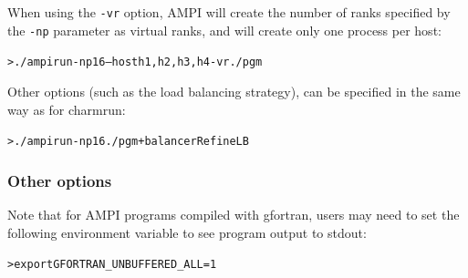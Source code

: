 \documentclass[10pt]{article}
\begin{document}
When using the \texttt{-vr} option, AMPI will create the number of ranks specified by the \texttt{-np} parameter as virtual ranks, and will create only one process per host:
\begin{alltt}
> ./ampirun -np 16 --host h1,h2,h3,h4 -vr ./pgm
\end{alltt}

Other options (such as the load balancing strategy), can be specified in the same way as for charmrun:
\begin{alltt}
> ./ampirun -np 16 ./pgm +balancer RefineLB
\end{alltt}


\subsubsection{Other options}

Note that for AMPI programs compiled with gfortran, users may need to set the following
environment variable to see program output to stdout:
\begin{alltt}
> export GFORTRAN_UNBUFFERED_ALL=1
\end{alltt}
\end{document}
